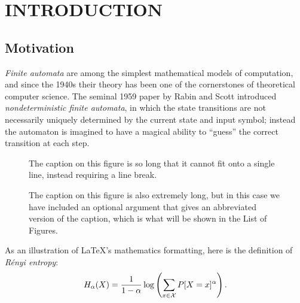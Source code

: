 \chapter{INTRODUCTION}

\section{Motivation}

{\em Finite automata} are among the simplest mathematical models
of computation, and since the 1940s their theory has been one of the
cornerstones of theoretical computer science.
The seminal 1959 paper by Rabin and Scott \cite{rabinscott59}
introduced {\em nondeterministic finite automata},
in which the state transitions are not necessarily uniquely determined
by the current state and input symbol; instead the automaton is
imagined to have a magical ability to ``guess'' the correct transition
at each step.

\begin{figure}[t]
\caption{The caption on this figure is so long that it cannot fit
onto a single line, instead requiring a line break.}
\end{figure}

\begin{figure}
\caption[Abbreviated caption]{The caption on this figure is also
extremely long, but in this case we have included an optional
argument that gives an abbreviated version of the caption, which
is what will be shown in the List of Figures.}
\end{figure}

As an illustration of \LaTeX's mathematics formatting,
here is the definition of {\em R\'enyi entropy}:
\begin{equation}
H_{\alpha}(X) =
\frac{1}{1-\alpha}
\log \left(\sum_{x \in {\cal X}}P[X=x]^{\alpha} \right) .
\end{equation}

